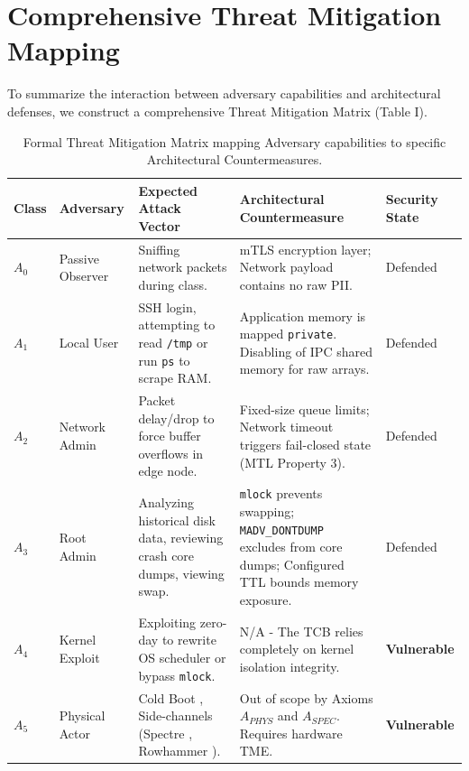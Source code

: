 \documentclass[conference]{IEEEtran}
\begin{document}
\section{Comprehensive Threat Mitigation Mapping}
To summarize the interaction between adversary capabilities and architectural defenses, we construct a comprehensive Threat Mitigation Matrix (Table I). 

\begin{table}[t]
\caption{Formal Threat Mitigation Matrix mapping Adversary capabilities to specific Architectural Countermeasures.}
\centering
\begin{tabular}{p{1.2cm} p{2.5cm} p{4.5cm} p{5.5cm} p{2.5cm}}
\toprule
\textbf{Class} & \textbf{Adversary} & \textbf{Expected Attack Vector} & \textbf{Architectural Countermeasure} & \textbf{Security State} \\
\midrule
$A_0$ & Passive Observer & Sniffing network packets during class. & mTLS encryption layer; Network payload contains no raw PII. & Defended \\
\midrule
$A_1$ & Local User & SSH login, attempting to read \texttt{/tmp} or run \texttt{ps} to scrape RAM. & Application memory is mapped \texttt{private}. Disabling of IPC shared memory for raw arrays. & Defended \\
\midrule
$A_2$ & Network Admin & Packet delay/drop to force buffer overflows in edge node. & Fixed-size queue limits; Network timeout triggers fail-closed state (MTL Property 3). & Defended \\
\midrule
$A_3$ & Root Admin & Analyzing historical disk data, reviewing crash core dumps, viewing swap. & \texttt{mlock} prevents swapping; \texttt{MADV\_DONTDUMP} excludes from core dumps; Configured TTL bounds memory exposure. & Defended \\
\midrule
$A_4$ & Kernel Exploit & Exploiting zero-day to rewrite OS scheduler or bypass \texttt{mlock}. & N/A - The TCB relies completely on kernel isolation integrity. & \textbf{Vulnerable} \\
\midrule
$A_5$ & Physical Actor & Cold Boot \cite{b4}, Side-channels (Spectre \cite{b18_spectre}, Rowhammer \cite{b19_row}). & Out of scope by Axioms $A_{PHYS}$ and $A_{SPEC}$. Requires hardware TME. & \textbf{Vulnerable} \\
\bottomrule
\end{tabular}
\end{table}
\end{document}
